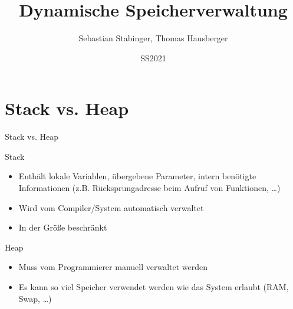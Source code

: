 \documentclass[presentation]{beamer}
\author{Sebastian Stabinger, Thomas Hausberger}
\date{SS2021}
\title{Dynamische Speicherverwaltung}
\begin{document}
\maketitle
\section{Stack vs. Heap}
\label{sec:orgd72c2d1}
\begin{frame}[label={sec:org84ec29e}]{Stack vs. Heap}
\begin{block}{Stack}
\begin{itemize}
\item Enthält lokale Variablen, übergebene Parameter, intern benötigte
Informationen (z.B. Rücksprungadresse beim Aufruf von Funktionen, \ldots{})
\item Wird vom Compiler/System \alert{automatisch verwaltet}
\item In der Größe beschränkt
\end{itemize}
\end{block}
\begin{block}{Heap}
\begin{itemize}
\item Muss vom Programmierer manuell verwaltet werden
\item Es kann so viel Speicher verwendet werden wie das System erlaubt
(RAM, Swap, \ldots{})
\end{itemize}
\end{block}
\end{frame}
\end{document}
